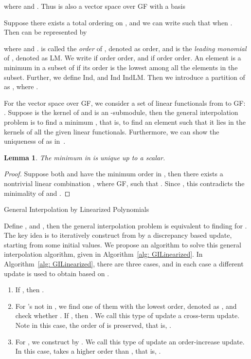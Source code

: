 \documentclass[11pt,onecolumn,draftcls]{IEEEtran}
\newtheorem{lemma}{Lemma}
\begin{document}
where  and . Thus  is also a vector space over GF with a basis

Suppose there exists a total ordering  on , and we can write  such that  when . Then  can be represented by

where  and .  is called the \emph{order} of , denoted as order, and  is the \emph{leading monomial} of , denoted as LM. We write  if order order, and  if order order. An element  is a minimum in a subset of  if its order is the lowest among all the elements in the subset. Further, we define Ind, and Ind IndLM. Then we introduce a partition of  as , where .


For the vector space  over GF, we consider a set of  linear functionals  from  to GF: . Suppose  is the kernel of  and  is an -submodule, then the general interpolation problem is to find a minimum , that is, to find an element  such that it lies in the kernels of all the given linear functionals. Furthermore, we can show the uniqueness of  as in~\cite{WangMcEliece05}.
\begin{lemma} \label{lemma: uniqueness}
The minimum in  is unique up to a scalar.
\end{lemma}
\begin{proof}
Suppose both  and  have the minimum order in , then there exists a nontrivial linear combination , where  GF, such that . Since , this contradicts the minimality of  and .
\end{proof}

\begin{algorithm}
\caption{General Interpolation by Linearized Polynomials}
\label{alg: GILinearized}
\begin{algorithmic}
\STATE {}
\ENDFOR
{}
\STATE{}
\STATE{}
\ENDFOR
\STATE{}
\IF{}
\STATE{}
\FOR{  }
\IF{}
\STATE{}
\ELSIF{}
\STATE{}
\ENDIF
\ENDFOR
\ENDIF
\ENDFOR
\STATE{}
\end{algorithmic}
\end{algorithm}

Define , and , then the general interpolation problem is equivalent to finding  for . The key idea is to iteratively construct  from  by a discrepancy based update, starting from some initial values. We propose an algorithm to solve this general interpolation algorithm, given in  Algorithm~\ref{alg: GILinearized}. In Algorithm~\ref{alg: GILinearized}, there are three cases, and in each case a different update is used to obtain  based on .
\begin{enumerate}
\item If , then .
\item For 's not in , we find one of them with the lowest order, denoted as , and check whether . If , then . We call this type of update a cross-term update. Note in this case, the order of  is preserved, that is, .
\item For , we construct  by . We call this type of update an order-increase update. In this case,  takes a higher order than , that is, .
\end{enumerate}
\end{document}
